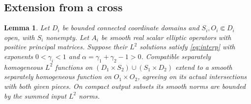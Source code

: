\documentclass[11pt]{article}
\newtheorem{lemma}[theorem]{Lemma}
\theoremstyle{definition}\newtheorem{definition}[theorem]{Definition}
\theoremstyle{remark}\newtheorem{remark}[theorem]{Remark}
\begin{document}
\subsection{Extension from a cross}
\begin{lemma}\label{lem:cross}
Let $D_i$ be bounded connected coordinate domains and $S_i,O_i\Subset D_i$
open, with $S_i$ nonempty. Let $A_i$ be smooth real scalar elliptic
operators with positive principal matrices. Suppose their $L^2$ solutions
satisfy \eqref{eq:interp} with exponents $0<\gamma_i<1$ and
$\alpha=\gamma_1+\gamma_2-1>0$.
Compatible separately homogeneous $L^2$ functions on
$(D_1\times S_2)\cup(S_1\times D_2)$ extend to a smooth separately
homogeneous function on $O_1\times O_2$, agreeing on its actual
intersections with both given pieces. On compact output subsets its
smooth norms are bounded by the summed input $L^2$ norms.
\end{lemma}
\end{document}

